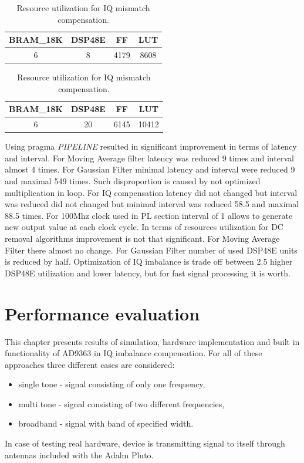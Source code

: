 \documentclass[en,printmode]{mgr}
\begin{document}
	\begin{table}[H]
		\centering
		\caption{}
		\begin{tabular}{|c|c|c|c|}
		\hline
		BRAM\_18K & DSP48E & FF   & LUT \\ \hline
		6         & 8     & 4179 & 8608\\ \hline
		\end{tabular}
		\caption{Resource utilization for IQ mismatch compensation.}
	\end{table}
	
	\begin{table}[H]
		\centering
		\caption{}
		\begin{tabular}{|c|c|c|c|}
		\hline
		BRAM\_18K & DSP48E & FF   & LUT \\ \hline
		6         & 20     & 6145 & 10412\\ \hline
		\end{tabular}
		\caption{Resource utilization for IQ mismatch compensation.}
	\end{table}
	
	Using pragma \textit{PIPELINE} resulted in significant improvement in terms of latency and
	interval. For Moving Average filter latency was reduced 9 times and interval almost 4 times.
	For Gaussian Filter minimal latency and interval were reduced 9 and maximal 549 times. Such
	disproportion is caused by not optimized multiplication in loop.
	For IQ compensation latency did not changed but interval was reduced 
	did not changed but minimal interval was reduced 58.5 and maximal 88.5 times.
	For 100Mhz clock used in PL section interval of 1 allows to generate new output value at 
	each clock cycle. In terms of resources utilization for DC removal algorithms improvement is not that
	significant. For Moving Average Filter there almost no change. For Gaussian Filter number of used
	DSP48E units is reduced by half. Optimization of IQ imbalance is trade off between 2.5 higher DSP48E
	utilization and lower latency, but for fast signal processing it is worth.
	
\chapter{Performance evaluation}
	This chapter presents results of simulation, hardware implementation and built in
	functionality of AD9363 in IQ imbalance compensation. For all of these approaches
	three different cases are considered:
	\begin{itemize}
		\item single tone - signal consisting of only one frequency,
		\item multi tone - signal consisting of two different frequencies,
		\item broadband - signal with band of specified width.
	\end{itemize}
	In case of testing real hardware, device is transmitting signal to itself through antennas
	included with the Adalm Pluto.
	\vspace{1cm}
\end{document}
